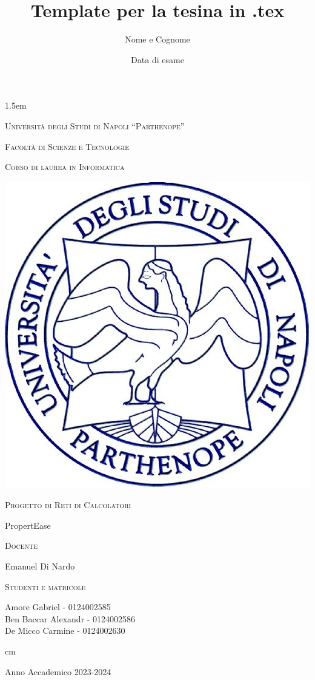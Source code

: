 \documentclass[12pt,italian,a4paper,oneside,openright]{book}
\title{Template per la tesina in .tex}
\author{Nome e Cognome}
\date{Data di esame}
\begin{document}

\baselineskip 1.5em

{ \thispagestyle{empty}


\vskip 1cm \large \centerline{\textsc{Università degli Studi di Napoli ``Parthenope''}}

\centerline {\textsc{Facoltà di Scienze e Tecnologie}}

\centerline {\small\textsc{Corso di laurea in Informatica}}

\begin{center}
\includegraphics[scale=0.24]{logo_parthenope.png}
\end{center}

\vskip 0.5cm

\large \centerline {\textsc{Progetto di Reti di Calcolatori}}

\vskip 0.5cm

\Large \centerline {PropertEase}


\vskip 4.5cm


\large
\begin{minipage}[t]{7cm}
\textsc{Docente}

Emanuel Di Nardo\\

\end{minipage}
\hfill
\begin{minipage}[t]{8cm}
    \textsc{Studenti e matricole}

    Amore Gabriel - 0124002585 \\
    Ben Baccar Alexandr - 0124002586 \\
    De Micco Carmine - 0124002630 \\
\end{minipage}

 cm \Large \centerline {Anno Accademico 2023-2024}
\vfill \eject}
\end{document}
